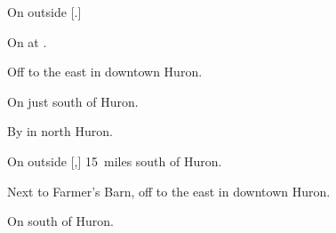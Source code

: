 
\begin{LocationList}

On  outside [.]

On  at .

Off  to the east in downtown Huron.

On  just south of Huron.

By  in north Huron.

On  outside [,] 15~miles south of Huron.

Next to Farmer's Barn, off  to the east in downtown Huron.

\Location{\TruckStop \Gas \Rest \Weigh}
On  south of Huron.

\end{LocationList}
